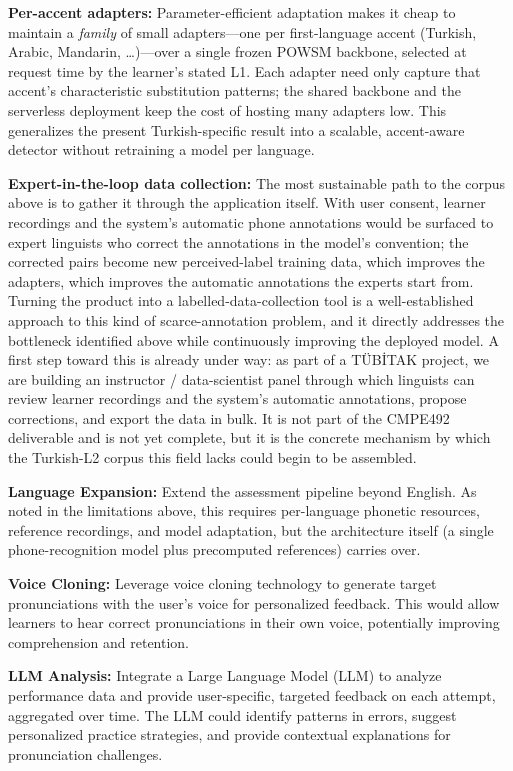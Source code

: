 \documentclass[a4paper,12pt]{report}
\begin{document}
\textbf{Per-accent adapters:} Parameter-efficient adaptation makes it cheap to maintain a \emph{family} of small adapters---one per first-language accent (Turkish, Arabic, Mandarin, \ldots)---over a single frozen POWSM backbone, selected at request time by the learner's stated L1. Each adapter need only capture that accent's characteristic substitution patterns; the shared backbone and the serverless deployment keep the cost of hosting many adapters low. This generalizes the present Turkish-specific result into a scalable, accent-aware detector without retraining a model per language.

\textbf{Expert-in-the-loop data collection:} The most sustainable path to the corpus above is to gather it through the application itself. With user consent, learner recordings and the system's automatic phone annotations would be surfaced to expert linguists who correct the annotations in the model's convention; the corrected pairs become new perceived-label training data, which improves the adapters, which improves the automatic annotations the experts start from. Turning the product into a labelled-data-collection tool is a well-established approach to this kind of scarce-annotation problem, and it directly addresses the bottleneck identified above while continuously improving the deployed model. A first step toward this is already under way: as part of a TÜBİTAK project, we are building an instructor / data-scientist panel through which linguists can review learner recordings and the system's automatic annotations, propose corrections, and export the data in bulk. It is not part of the CMPE492 deliverable and is not yet complete, but it is the concrete mechanism by which the Turkish-L2 corpus this field lacks could begin to be assembled.

\textbf{Language Expansion:} Extend the assessment pipeline beyond English. As noted in the limitations above, this requires per-language phonetic resources, reference recordings, and model adaptation, but the architecture itself (a single phone-recognition model plus precomputed references) carries over.

\textbf{Voice Cloning:} Leverage voice cloning technology to generate target pronunciations with the user's voice for personalized feedback. This would allow learners to hear correct pronunciations in their own voice, potentially improving comprehension and retention.

\textbf{LLM Analysis:} Integrate a Large Language Model (LLM) to analyze performance data and provide user-specific, targeted feedback on each attempt, aggregated over time. The LLM could identify patterns in errors, suggest personalized practice strategies, and provide contextual explanations for pronunciation challenges.
\end{document}
